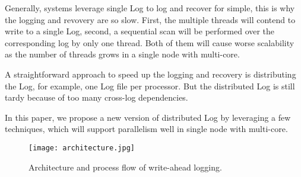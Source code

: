 Generally, systems leverage single Log to log and recover for simple, this is why the logging and revovery are so slow. First, the multiple threads will contend to write to a single Log, second, a sequential scan will be performed over the corresponding log by only one thread. Both of them will cause worse scalability as the number of threads grows in a single node with multi-core.

A straightforward approach to speed up the logging and recovery is distributing the Log, for example, one Log file per processor. But the distributed Log is still tardy because of too many cross-log dependencies.

In this paper, we propose a new version of distributed Log by leveraging a few techniques, which will support parallelism well in single node with multi-core.

\begin{figure}[htbp]
  \centering
  \texttt{[image: architecture.jpg]}\\
  \caption{Architecture and process flow of write-ahead logging.}\label{fig:architecture}
\end{figure}

